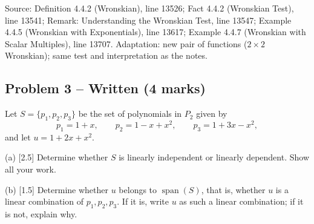 \documentclass[11pt,a4paper]{article}
\newcommand{\Src}[1]{{\footnotesize\color{black!65}Source: #1}}
\begin{document}
\Src{Definition 4.4.2 (Wronskian), line 13526; Fact 4.4.2 (Wronskian Test), line 13541; Remark: Understanding the Wronskian Test, line 13547; Example 4.4.5 (Wronskian with Exponentials), line 13617; Example 4.4.7 (Wronskian with Scalar Multiples), line 13707. Adaptation: new pair of functions ($2\times2$ Wronskian); same test and interpretation as the notes.}\par
\subsection*{Problem 3 -- Written (4 marks)}
Let $S=\{p_1,p_2,p_3\}$ be the set of polynomials in $P_2$ given by\[p_1=1+x,\qquad p_2=1-x+x^{2},\qquad p_3=1+3x-x^{2},\]and let $u=1+2x+x^{2}$.\par (a) [2.5] Determine whether $S$ is linearly independent or linearly dependent. Show all your work.\par (b) [1.5] Determine whether $u$ belongs to $\operatorname{span}(S)$, that is, whether $u$ is a linear combination of $p_1,p_2,p_3$. If it is, write $u$ as such a linear combination; if it is not, explain why.\par
\end{document}

